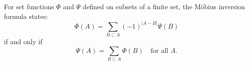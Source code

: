 For set functions $\Phi$ and $\Psi$ defined on subsets of a finite set, the M\"{o}bius inversion formula states:
$$\Phi(A) = \sum_{B \subset A} (-1)^{|A-B|} \Psi(B)$$
if and only if
$$\Psi(A) = \sum_{B \subset A} \Phi(B) \quad \text{for all } A.$$
